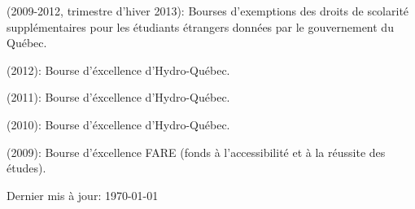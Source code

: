 \documentclass[letterpaper]{article}
\def\footerlink{}
\renewenvironment{itemize}{
  \begin{list}{}{
    \setlength{\leftmargin}{1.5em}
  }
}{
  \end{list}
}
\begin{document}
\begin{itemize}
    \item (2009-2012, trimestre d'hiver 2013): Bourses d'exemptions des droits
    de scolarité supplémentaires pour les étudiants étrangers données par le
    gouvernement du Québec.
    \item (2012): Bourse d'éxcellence d'Hydro-Québec. 
    \item (2011): Bourse d'éxcellence d'Hydro-Québec. 
    \item (2010): Bourse d'éxcellence d'Hydro-Québec.
    \item (2009): Bourse d'éxcellence FARE (fonds à l'accessibilité et à la
    réussite des études).
    
\end{itemize}




\bigskip

\begin{center}
  \begin{footnotesize}
    Dernier mis à jour: \ddmmyyyydate \today \\
    \href{\footerlink}{\texttt{\footerlink}}
  \end{footnotesize}
\end{center}
\end{document}
